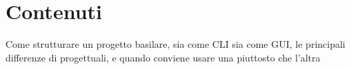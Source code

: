 \section{Contenuti}
Come strutturare un progetto basilare, sia come CLI sia come GUI, le principali differenze di progettuali, e quando conviene usare una piuttosto che l'altra